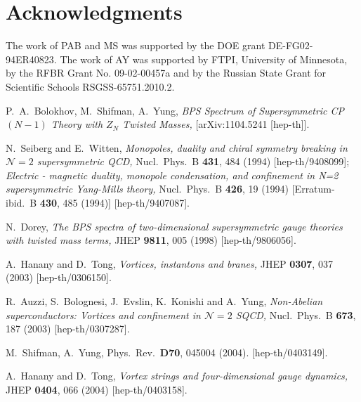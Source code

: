 \documentclass[epsfig,12pt]{article}
\begin{document}
\section*{Acknowledgments}
The work of PAB and MS was supported by the DOE grant DE-FG02-94ER40823.
The work of AY was  supported
by  FTPI, University of Minnesota,
by the RFBR Grant No. 09-02-00457a
and by the Russian State Grant for
Scientific Schools RSGSS-65751.2010.2.
	
	

\begin{thebibliography}{99}

  P.~A.~Bolokhov, M.~Shifman, A.~Yung,
{\em BPS Spectrum of Supersymmetric {\rm CP}$(N-1)$ Theory with $Z_N$ Twisted Masses,}
    [arXiv:1104.5241 [hep-th]].
    
  N.~Seiberg and E.~Witten,
{\em Monopoles, duality and chiral symmetry breaking in ${\mathcal N}=2$ supersymmetric QCD,}
  Nucl.\ Phys.\ B {\bf 431}, 484 (1994)
  [hep-th/9408099];
{\em Electric - magnetic duality, monopole condensation, and confinement in N=2 supersymmetric Yang-Mills theory,}
  Nucl.\ Phys.\ B {\bf 426}, 19 (1994)
  [Erratum-ibid.\ B {\bf 430}, 485 (1994)]
  [hep-th/9407087].

  N.~Dorey,
{\em The BPS spectra of two-dimensional supersymmetric gauge theories with twisted mass terms,}
  JHEP {\bf 9811}, 005 (1998)
  [hep-th/9806056].

   A.~Hanany and D.~Tong,
  {\em Vortices, instantons and branes,}
  JHEP {\bf 0307}, 037 (2003)
  [hep-th/0306150].
  
   R.~Auzzi, S.~Bolognesi, J.~Evslin, K.~Konishi and A.~Yung,
{\em Non-Abelian superconductors: Vortices and confinement in ${\mathcal N}=2$ SQCD,}
  Nucl.\ Phys.\ B {\bf 673}, 187 (2003)
  [hep-th/0307287].

  M.~Shifman, A.~Yung,
  Phys.\ Rev.\  {\bf D70}, 045004 (2004).
  [hep-th/0403149].

      A.~Hanany and D.~Tong,
{\em Vortex strings and four-dimensional gauge dynamics,}
  JHEP {\bf 0404}, 066 (2004)
  [hep-th/0403158].
  


\end{thebibliography}
\end{document}
